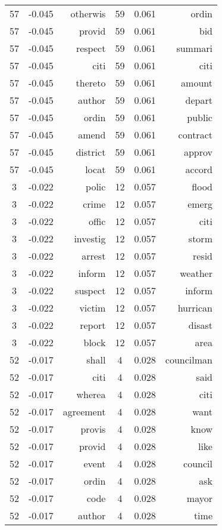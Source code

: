 \begin{table}[ht]
\begin{tabular}{ccr|ccr}
   \cmidrule(l){1-3} \cmidrule(l){4-6}
  57 & -0.045 & otherwis &   59 & 0.061 & ordin \\ 
    57 & -0.045 & provid &   59 & 0.061 & bid \\ 
    57 & -0.045 & respect &   59 & 0.061 & summari \\ 
    57 & -0.045 & citi &   59 & 0.061 & citi \\ 
    57 & -0.045 & thereto &   59 & 0.061 & amount \\ 
    57 & -0.045 & author &   59 & 0.061 & depart \\ 
    57 & -0.045 & ordin &   59 & 0.061 & public \\ 
    57 & -0.045 & amend &   59 & 0.061 & contract \\ 
    57 & -0.045 & district &   59 & 0.061 & approv \\ 
    57 & -0.045 & locat &   59 & 0.061 & accord \\ 
   \cmidrule(l){1-3} \cmidrule(l){4-6}
   3 & -0.022 & polic &   12 & 0.057 & flood \\ 
     3 & -0.022 & crime &   12 & 0.057 & emerg \\ 
     3 & -0.022 & offic &   12 & 0.057 & citi \\ 
     3 & -0.022 & investig &   12 & 0.057 & storm \\ 
     3 & -0.022 & arrest &   12 & 0.057 & resid \\ 
     3 & -0.022 & inform &   12 & 0.057 & weather \\ 
     3 & -0.022 & suspect &   12 & 0.057 & inform \\ 
     3 & -0.022 & victim &   12 & 0.057 & hurrican \\ 
     3 & -0.022 & report &   12 & 0.057 & disast \\ 
     3 & -0.022 & block &   12 & 0.057 & area \\ 
   \cmidrule(l){1-3} \cmidrule(l){4-6}
  52 & -0.017 & shall &    4 & 0.028 & councilman \\ 
    52 & -0.017 & citi &    4 & 0.028 & said \\ 
    52 & -0.017 & wherea &    4 & 0.028 & citi \\ 
    52 & -0.017 & agreement &    4 & 0.028 & want \\ 
    52 & -0.017 & provis &    4 & 0.028 & know \\ 
    52 & -0.017 & provid &    4 & 0.028 & like \\ 
    52 & -0.017 & event &    4 & 0.028 & council \\ 
    52 & -0.017 & ordin &    4 & 0.028 & ask \\ 
    52 & -0.017 & code &    4 & 0.028 & mayor \\ 
    52 & -0.017 & author &    4 & 0.028 & time \\ 
   \bottomrule 
\end{tabular}
\endgroup
\end{table}

